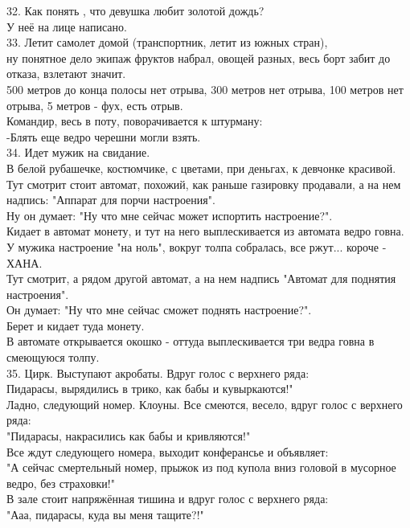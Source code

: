 \documentclass[a4paper,20pt,notitlepage]{extbook}
\begin{document}
	32. Как понять , что девушка любит золотой дождь?\\
		У неё на лице написано.\\
		
	33. Летит самолет домой (транспортник, летит из южных стран), \\
	ну понятное дело экипаж фруктов набрал, овощей разных, весь борт забит до отказа, взлетают значит.\\
	500 метров до конца полосы нет отрыва, 300 метров нет отрыва, 100 метров нет отрыва, 5 метров - фух, есть отрыв. \\
	Командир, весь в поту, поворачивается к штурману:\\
	-Блять еще ведро черешни могли взять.\\
	
	34. Идет мужик на свидание. \\
	В белой рубашечке, костюмчике, с цветами, при деньгах, к девчонке красивой.\\
	 Тут смотрит стоит автомат, похожий, как раньше газировку продавали, а на нем надпись: "Аппарат для порчи настроения". \\
	 Ну он думает: "Ну что мне сейчас может испортить настроение?". \\
	 Кидает в автомат монету, и тут на него выплескивается из автомата ведро говна. \\
	 У мужика настроение "на ноль", вокруг толпа собралась, все ржут... короче - ХАНА.\\
	  Тут смотрит, а рядом другой автомат, а на нем надпись "Автомат для поднятия настроения".\\
	   Он думает: "Ну что мне сейчас сможет поднять настроение?". \\
	   Берет и кидает туда монету. \\
	   В автомате открывается окошко - оттуда выплескивается три ведра говна в смеющуюся толпу.\\
	   
	35. Цирк. Выступают акробаты. Вдруг голос с верхнего ряда: \\
	Пидарасы, вырядились в трико, как бабы и кувыркаются!"\\
	Ладно, следующий номер. Клоуны. Все смеются, весело, вдруг голос с верхнего ряда:\\
	 "Пидарасы, накрасились как бабы и кривляются!"\\
	Все ждут следующего номера, выходит конферансье и объявляет: \\
	"А сейчас смертельный номер, прыжок из под купола вниз головой в мусорное ведро, без страховки!"\\
	В зале стоит напряжённая тишина и вдруг голос с верхнего ряда: \\
	"Ааа, пидарасы, куда вы меня тащите?!"\\
	
\end{document}
